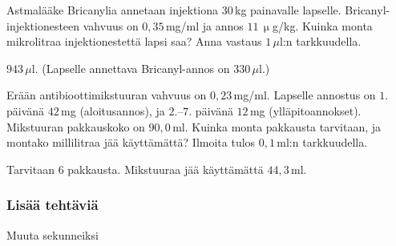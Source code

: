 \begin{tehtavasivu}

\begin{tehtava}
Astmalääke Bricanylia annetaan injektiona $30$\,kg painavalle lapselle. Bricanyl-injektionesteen vahvuus on $0,35$\,mg/ml ja annos $11$\,$\upmu$g/kg. Kuinka monta mikrolitraa injektionestettä lapsi saa? Anna vastaus $1$\,$\mu$l:n tarkkuudella. %
 	\begin{vastaus}
$943$\,$\mu$l. (Lapselle annettava Bricanyl-annos on $330$\,$\mu$l.) %
	\end{vastaus}
\end{tehtava}

\begin{tehtava}
Erään antibioottimikstuuran vahvuus on $0,23$\,mg/ml. Lapselle annostus on $1.$ päivänä $42$\,mg (aloitusannos), ja $2$.--$7$. päivänä $12$\,mg (ylläpitoannokset). Mikstuuran pakkauskoko on $90,0$\,ml. Kuinka monta pakkausta tarvitaan, ja montako millilitraa jää käyttämättä? Ilmoita tulos $0,1$\,ml:n tarkkuudella.
 \begin{vastaus}
Tarvitaan $6$ pakkausta. Mikstuuraa jää käyttämättä $44,3$\,ml.
 \end{vastaus}
\end{tehtava}

\subsubsection*{Lisää tehtäviä}

\begin{tehtava}
Muuta sekunneiksi
	\begin{vastaus}
	\end{vastaus}
\end{tehtava}


\end{tehtavasivu}
